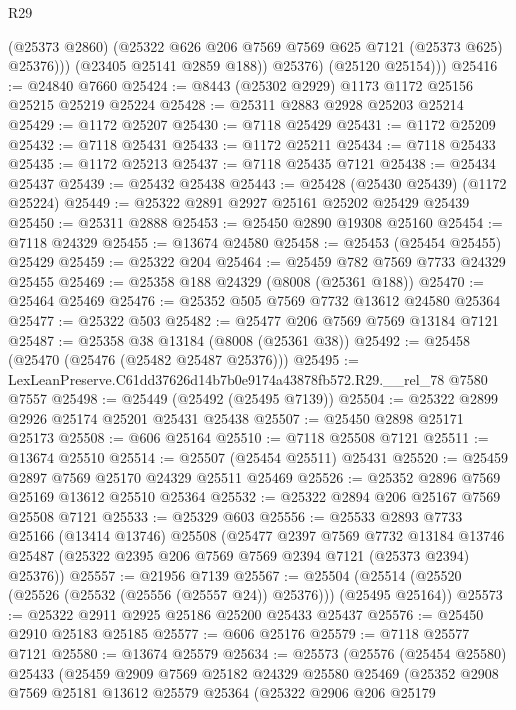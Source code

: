 \begin{lexlean}{R29}
\begin{coremodule}
                (@25373 @2860)
                (@25322 @626 @206 @7569 @7569 @625 @7121 (@25373 @625) @25376)))
            (@23405 @25141 @2859 @188))
          @25376)
        (@25120 @25154)))
@25416 := @24840 @7660
@25424 := @8443 (@25302 @2929) @1173 @1172 @25156 @25215 @25219 @25224
@25428 := @25311 @2883 @2928 @25203 @25214
@25429 := @1172 @25207
@25430 := @7118 @25429
@25431 := @1172 @25209
@25432 := @7118 @25431
@25433 := @1172 @25211
@25434 := @7118 @25433
@25435 := @1172 @25213
@25437 := @7118 @25435 @7121
@25438 := @25434 @25437
@25439 := @25432 @25438
@25443 := @25428 (@25430 @25439) (@1172 @25224)
@25449 := @25322 @2891 @2927 @25161 @25202 @25429 @25439
@25450 := @25311 @2888
@25453 := @25450 @2890 @19308 @25160
@25454 := @7118 @24329
@25455 := @13674 @24580
@25458 := @25453 (@25454 @25455) @25429
@25459 := @25322 @204
@25464 := @25459 @782 @7569 @7733 @24329 @25455
@25469 := @25358 @188 @24329 (@8008 (@25361 @188))
@25470 := @25464 @25469
@25476 := @25352 @505 @7569 @7732 @13612 @24580 @25364
@25477 := @25322 @503
@25482 := @25477 @206 @7569 @7569 @13184 @7121
@25487 := @25358 @38 @13184 (@8008 (@25361 @38))
@25492 := @25458 (@25470 (@25476 (@25482 @25487 @25376)))
@25495 := LexLeanPreserve.C61dd37626d14b7b0e9174a43878fb572.R29.__rel_78 @7580 @7557
@25498 := @25449 (@25492 (@25495 @7139))
@25504 := @25322 @2899 @2926 @25174 @25201 @25431 @25438
@25507 := @25450 @2898 @25171 @25173
@25508 := @606 @25164
@25510 := @7118 @25508 @7121
@25511 := @13674 @25510
@25514 := @25507 (@25454 @25511) @25431
@25520 := @25459 @2897 @7569 @25170 @24329 @25511 @25469
@25526 := @25352 @2896 @7569 @25169 @13612 @25510 @25364
@25532 := @25322 @2894 @206 @25167 @7569 @25508 @7121
@25533 := @25329 @603
@25556 := @25533
    @2893
    @7733
    @25166
    (@13414 @13746)
    @25508
    (@25477
      @2397
      @7569
      @7732
      @13184
      @13746
      @25487
      (@25322 @2395 @206 @7569 @7569 @2394 @7121 (@25373 @2394) @25376))
@25557 := @21956 @7139
@25567 := @25504 (@25514 (@25520 (@25526 (@25532 (@25556 (@25557 @24)) @25376))) (@25495 @25164))
@25573 := @25322 @2911 @2925 @25186 @25200 @25433 @25437
@25576 := @25450 @2910 @25183 @25185
@25577 := @606 @25176
@25579 := @7118 @25577 @7121
@25580 := @13674 @25579
@25634 := @25573
    (@25576
      (@25454 @25580)
      @25433
      (@25459
        @2909
        @7569
        @25182
        @24329
        @25580
        @25469
        (@25352
          @2908
          @7569
          @25181
          @13612
          @25579
          @25364
          (@25322
            @2906
            @206
            @25179

\end{coremodule}
\end{lexlean}
